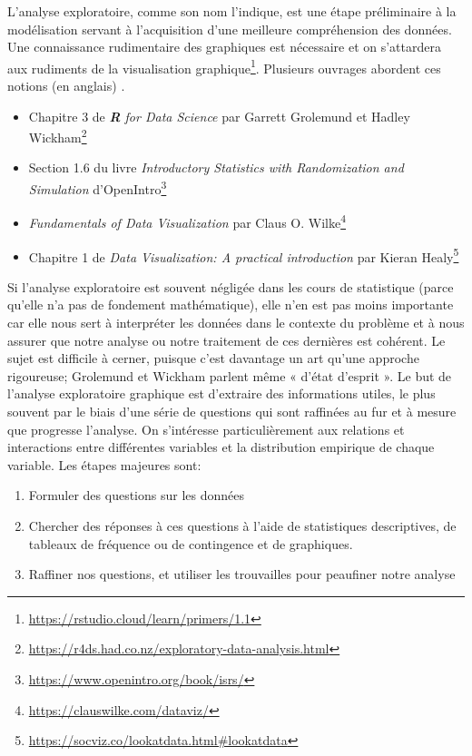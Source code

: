 \documentclass[
  11pt,
  letterpaper,
]{article}
\providecommand{\tightlist}{%
  \setlength{\itemsep}{0pt}\setlength{\parskip}{0pt}}
\renewcommand{\href}[2]{#2\footnote{\url{#1}}}
\theoremstyle{definition}
\theoremstyle{definition}
\theoremstyle{definition}
\theoremstyle{remark}
\begin{document}
L'analyse exploratoire, comme son nom l'indique, est une étape préliminaire à la modélisation servant à l'acquisition d'une meilleure compréhension des données.
Une connaissance rudimentaire des graphiques est nécessaire et on s'attardera aux \href{https://rstudio.cloud/learn/primers/1.1}{rudiments de la visualisation graphique}. Plusieurs ouvrages abordent ces notions (en anglais) .

\begin{itemize}
\tightlist
\item
  \href{https://r4ds.had.co.nz/exploratory-data-analysis.html}{Chapitre 3 de \emph{\textbf{R} for Data Science} par Garrett Grolemund et Hadley Wickham}
\item
  \href{https://www.openintro.org/book/isrs/}{Section 1.6 du livre \emph{Introductory Statistics with Randomization and Simulation} d'OpenIntro}
\item
  \href{https://clauswilke.com/dataviz/}{\emph{Fundamentals of Data Visualization} par Claus O. Wilke}
\item
  \href{https://socviz.co/lookatdata.html\#lookatdata}{Chapitre 1 de \emph{Data Visualization: A practical introduction} par Kieran Healy}
\end{itemize}

Si l'analyse exploratoire est souvent négligée dans les cours de statistique (parce qu'elle n'a pas de fondement mathématique), elle n'en est pas moins importante car elle nous sert à interpréter les données dans le contexte du problème et à nous assurer que notre analyse ou notre traitement de ces dernières est cohérent. Le sujet est difficile à cerner, puisque c'est davantage un art qu'une approche rigoureuse; Grolemund et Wickham parlent même « d'état d'esprit ». Le but de l'analyse exploratoire graphique est d'extraire des informations utiles, le plus souvent par le biais d'une série de questions qui sont raffinées au fur et à mesure que progresse l'analyse. On s'intéresse particulièrement aux relations et interactions entre différentes variables et la distribution empirique de chaque variable. Les étapes majeures sont:

\begin{enumerate}
\def\labelenumi{\arabic{enumi}.}
\tightlist
\item
  Formuler des questions sur les données
\item
  Chercher des réponses à ces questions à l'aide de statistiques descriptives, de tableaux de fréquence ou de contingence et de graphiques.
\item
  Raffiner nos questions, et utiliser les trouvailles pour peaufiner notre analyse
\end{enumerate}
\end{document}
